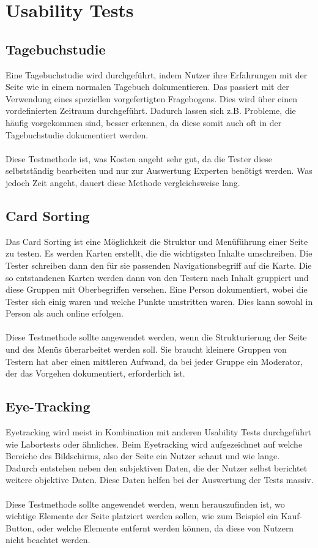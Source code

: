 \section{Usability Tests}
\subsection{Tagebuchstudie}
Eine Tagebuchstudie wird durchgeführt, indem Nutzer ihre Erfahrungen mit der Seite wie in einem normalen Tagebuch dokumentieren.
Das passiert mit der Verwendung eines speziellen vorgefertigten Fragebogens.
Dies wird über einen vordefinierten Zeitraum durchgeführt.
Dadurch lassen sich z.B. Probleme, die häufig vorgekommen sind, besser erkennen, da diese somit auch oft in der Tagebuchstudie dokumentiert werden.\\\\
Diese Testmethode ist, was Kosten angeht sehr gut, da die Tester diese selbstständig bearbeiten und nur zur Auswertung Experten benötigt werden.
Was jedoch Zeit angeht, dauert diese Methode vergleichsweise lang.\autocite[vgl.~][]{usability.de.tagebuch}

\subsection{Card Sorting}
Das Card Sorting ist eine Möglichkeit die Struktur und Menüführung einer Seite zu testen.
Es werden Karten erstellt, die die wichtigsten Inhalte umschreiben.
Die Tester schreiben dann den für sie passenden Navigationsbegriff auf die Karte.
Die so entstandenen Karten werden dann von den Testern nach Inhalt gruppiert und diese Gruppen mit Oberbegriffen versehen.
Eine Person dokumentiert, wobei die Tester sich einig waren und welche Punkte umstritten waren.
Dies kann sowohl in Person als auch online erfolgen.\\\\
Diese Testmethode sollte angewendet werden, wenn die Strukturierung der Seite und des Menüs überarbeitet werden soll.
Sie braucht kleinere Gruppen von Testern hat aber einen mittleren Aufwand, da bei jeder Gruppe ein Moderator, der das Vorgehen dokumentiert, erforderlich ist.\autocite[vgl.~][]{usability.de.cardsorting}

\subsection{Eye-Tracking}\label{subsec:eyetracking}
Eyetracking wird meist in Kombination mit anderen Usability Tests durchgeführt wie Labortests oder ähnliches.
Beim Eyetracking wird aufgezeichnet auf welche Bereiche des Bildschirms, also der Seite ein Nutzer schaut und wie lange.
Dadurch entstehen neben den subjektiven Daten, die der Nutzer selbst berichtet weitere objektive Daten.
Diese Daten helfen bei der Auswertung der Tests massiv.\\\\
Diese Testmethode sollte angewendet werden, wenn herauszufinden ist, wo wichtige Elemente der Seite platziert werden sollen, wie zum Beispiel ein Kauf-Button,
oder welche Elemente entfernt werden können, da diese von Nutzern nicht beachtet werden.\autocite[vgl.~][]{usability.de.eyetracking}

